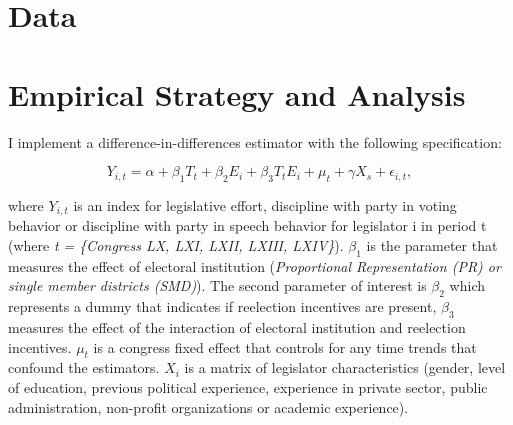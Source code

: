 \documentclass{article}
\begin{document}
\section{Data}
\section{Empirical Strategy and Analysis}

I implement a difference-in-differences estimator with the following specification:

\begin{equation}
Y_{i, t} = \alpha + \beta_1 T_t + \beta_2 E_i + \beta_3 T_t E_i + \mu_t + \gamma X_s+ \epsilon_{i, t},
\end{equation}

where $Y_{i,t}$ is an index for legislative effort, discipline with party in voting behavior or discipline with party in speech behavior for legislator i in period t (where \textit{t = \{Congress LX, LXI, LXII, LXIII, LXIV\}}). $\beta_1$ is the parameter that measures the effect of electoral institution (\textit{Proportional Representation (PR) or single member districts (SMD)}). The second parameter of interest is $\beta_2$ which represents a dummy that indicates if reelection incentives are present, $\beta_3$ measures the effect of the interaction of electoral institution and reelection incentives. $\mu_t$ is a congress fixed effect that controls for any time trends that confound the estimators. $X_i$ is a matrix of legislator characteristics (gender, level of education, previous political experience, experience in private sector, public administration, non-profit organizations or academic experience).\\
\\
\end{document}
